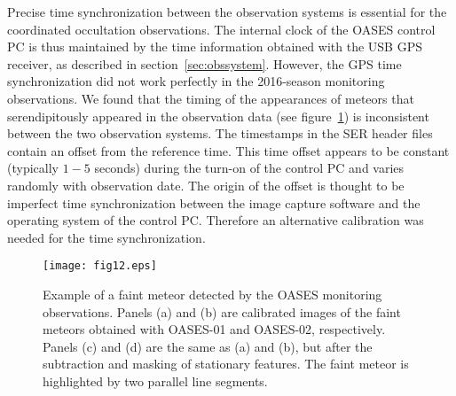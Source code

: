 \documentclass{pasj01}
\newcommand{\void}[1]{}
\renewcommand{\textcolor}{\void}
\begin{document}
Precise time synchronization between the observation systems
is essential for the coordinated occultation observations.
The internal clock of the OASES control PC is thus maintained by 
the time information obtained with the USB GPS receiver, as described in section~\ref{sec:obssystem}.
However, the GPS time synchronization did not work perfectly in the 2016-season monitoring observations.
%
We found that the timing of the appearances of meteors that serendipitously appeared 
in the observation data (see figure~\ref{fig44})
is inconsistent between the two observation systems. 
%
The timestamps in the SER header files contain an offset from the reference time.
This time offset appears to be constant (typically $1-5$ seconds) during the turn-on of the control PC 
and varies randomly with observation date.
The origin of the offset is thought to be imperfect time synchronization 
between the image capture software and the operating system of the control PC.
Therefore an alternative calibration was needed for the time synchronization.

\begin{figure}[!pt]
\begin{center}
   \texttt{[image: fig12.eps]}
   \caption{Example of a faint meteor detected by the OASES monitoring observations.
   Panels (a) and (b) are calibrated images of the faint meteors 
   obtained with OASES-01 and OASES-02, respectively.
   Panels (c) and (d) are the same as (a) and (b), but after the subtraction and masking of stationary features.
   The faint meteor is highlighted by two parallel line segments.
  }
   \label{fig44}
 \end{center}
\end{figure}
\end{document}

